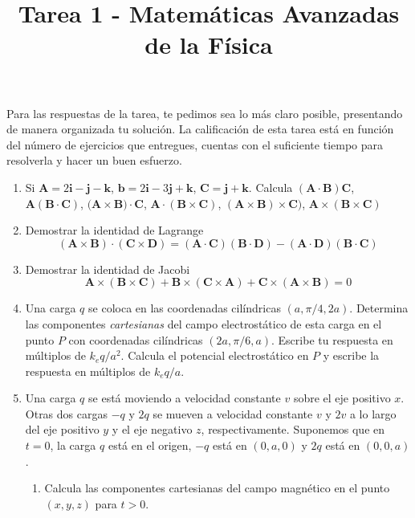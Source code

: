 \documentclass[12pt]{article}
\title{Tarea 1 - Matemáticas Avanzadas de la Física}
\date{ }
\begin{document}
\vspace{-4cm}
\renewcommand\labelenumii{\theenumi.{\arabic{enumii}}}
\maketitle
\fontsize{14}{14}\selectfont
Para las respuestas de la tarea, te pedimos sea lo más claro posible, presentando de manera organizada tu solución. La calificación de esta tarea está en función del número de ejercicios que entregues, cuentas con el suficiente tiempo para resolverla y hacer un buen esfuerzo.
\begin{enumerate}
\item Si $\mathbf{A}= 2 \mathbf{i} - \mathbf{j} - \mathbf{k}$, $\mathbf{b}= 2 \mathbf{i} - 3 \mathbf{j} + \mathbf{k}$, $\mathbf{C}= \mathbf{j} + \mathbf{k}$. Calcula $(\mathbf{A} \cdot \mathbf{B}) \mathbf{C}$, $\mathbf{A}(\mathbf{B} \cdot \mathbf{C})$, $(\mathbf{A \times \mathbf{B}) \cdot C}$, $\mathbf{A} \cdot (\mathbf{B} \times \mathbf{C})$, $(\mathbf{A} \times \mathbf{B}) \times \mathbf{C})$, $\mathbf{A} \times (\mathbf{B} \times \mathbf{C})$
\item Demostrar la identidad de Lagrange
\[ (\mathbf{A} \times \mathbf{B}) \cdot (\mathbf{C} \times \mathbf{D}) = (\mathbf{A} \cdot \mathbf{C})(\mathbf{B} \cdot \mathbf{D}) - (\mathbf{A} \cdot \mathbf{D})(\mathbf{B} \cdot \mathbf{C}) \]
\item Demostrar la identidad de Jacobi
\[ \mathbf{A} \times (\mathbf{B} \times \mathbf{C}) + \mathbf{B} \times (\mathbf{C} \times \mathbf{A}) + \mathbf{C} \times (\mathbf{A} \times \mathbf{B}) = 0 \]
\item Una carga $q$ se coloca en las coordenadas cilíndricas $(a, \pi/4, 2a)$. Determina las componentes \emph{cartesianas} del campo electrostático de esta carga en el punto $P$ con coordenadas cilíndricas $(2a, \pi/6, a)$. Escribe tu respuesta en múltiplos de $k_{e} q /a^{2}$. Calcula el potencial electrostático en $P$ y escribe la respuesta en múltiplos de $k_{e} q/a$.
\item Una carga $q$ se está moviendo a velocidad constante $v$ sobre el eje positivo $x$. Otras dos cargas $-q$ y $2q$ se mueven a velocidad constante $v$ y $2v$ a lo largo del eje positivo $y$ y el eje negativo $z$, respectivamente. Suponemos que en $t=0$, la carga $q$ está en el origen, $-q$ está en $(0,a,0)$ y $2q$ está en $(0,0,a)$.
\begin{enumerate}
\item Calcula las componentes cartesianas del campo magnético en el punto $(x,y,z)$ para $t>0$.

\end{enumerate}
\end{enumerate}
\end{document}
